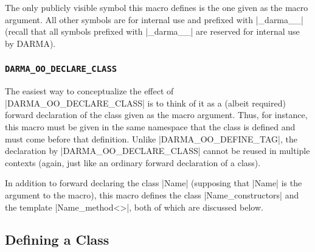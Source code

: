 The only publicly visible symbol this macro defines is the one given as the
macro argument.  All other symbols are for internal use and prefixed with
|_darma__| (recall that all symbols prefixed with |_darma__| are reserved for
internal use by DARMA).

\subsubsection{\texttt{DARMA\_OO\_DECLARE\_CLASS}}

The easiest way to conceptualize the effect of |DARMA_OO_DECLARE_CLASS| is to
think of it as a (albeit required) forward declaration of the class given as the
macro argument.  Thus, for instance, this macro must be given in the same
namespace that the class is defined and must come before that definition. 
Unlike |DARMA_OO_DEFINE_TAG|, the declaration by |DARMA_OO_DECLARE_CLASS| cannot
be reused in multiple contexts (again, just like an ordinary forward
declaration of a class).

In addition to forward declaring the class |Name| (supposing that |Name| is the
argument to the macro), this macro defines the class |Name_constructors| and the
template |Name_method<>|, both of which are discussed below.

\subsection{Defining a Class}

